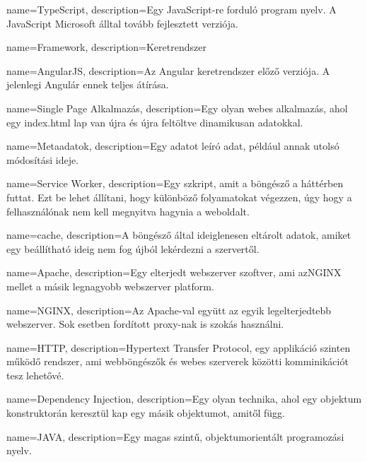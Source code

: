 {
        name=TypeScript,
        description={Egy JavaScript-re forduló program nyelv. A JavaScript Microsoft álltal tovább fejlesztett verziója.}
}

{
        name=Framework,
        description={Keretrendszer}
}

{
        name=AngularJS,
        description={Az Angular keretrendszer előző verziója. A jelenlegi Angulár ennek teljes átírása.}
}

{
        name=Single Page Alkalmazás,
        description={Egy olyan webes alkalmazás, ahol egy index.html lap van újra és újra feltöltve dinamikusan adatokkal.}
}

{
        name=Metaadatok,
        description={Egy adatot leíró adat, például annak utolsó módosítási ideje.}
}

{
        name=Service Worker,
        description={Egy szkript, amit a böngésző a háttérben futtat. 
        Ezt be lehet állítani, hogy különböző folyamatokat végezzen, úgy hogy a felhasználónak nem kell megnyitva hagynia a weboldalt.}
}

{
        name=cache,
        description={A böngésző által ideiglenesen eltárolt adatok, amiket egy beállítható ideig nem fog újból lekérdezni a szervertől.}
}

{
        name=Apache,
        description={Egy elterjedt webszerver szoftver, ami az\Gls{NGINX} mellet a másik legnagyobb webszerver platform.}
}

{
        name=NGINX,
        description={Az \Gls{Apache}-val együtt az egyik legelterjedtebb webszerver. Sok esetben fordított proxy-nak is szokás használni.}
}

{
        name=HTTP,
        description={Hypertext Transfer Protocol, egy applikáció szinten működő rendszer, ami webböngészők és webes szerverek közötti komminikációt tesz lehetővé.}
}

{
        name=Dependency Injection,
        description={Egy olyan technika, ahol egy objektum konstruktorán keresztül kap egy másik objektumot, amitől függ.}
}

{
        name=JAVA,
        description={Egy magas szintű, objektumorientált programozási nyelv.}
}

